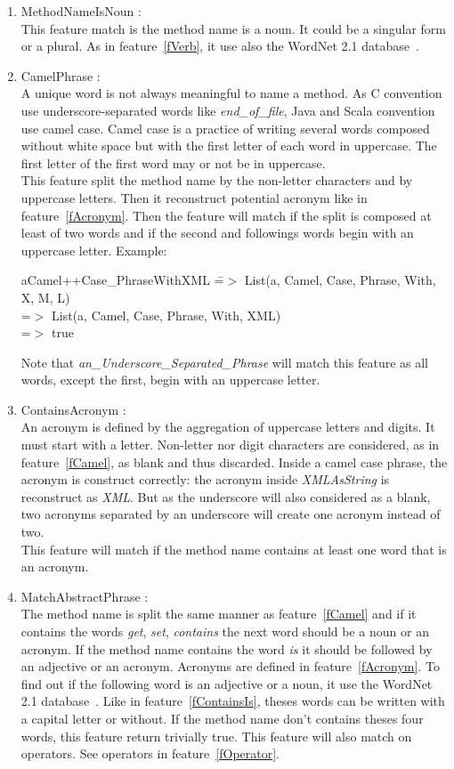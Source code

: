 \documentclass[12pt]{article}
\newcommand{\code}[1]{{\fontfamily{phv}\selectfont \small{\begin{tabbing} #1 \end{tabbing}}}}
\begin{document}
\begin{enumerate}
\item MethodNameIsNoun :\\
	This feature match is the method name is a noun. It could be a singular form or a plural. As in feature~\ref{fVerb}, it use also the WordNet 2.1 database~\cite{wordNet}.
\item CamelPhrase : \label{fCamel}\\
	A unique word is not always meaningful to name a method. As C convention use underscore-separated words like \textit{end\_of\_file}, Java and Scala convention use camel case. Camel case is a practice of writing several words composed without white space but with the first letter of each word in uppercase. The first letter of the first word may or not be in uppercase.\\
This feature split the method name by the non-letter characters and by uppercase letters. Then it reconstruct potential acronym like in feature~\ref{fAcronym}. Then the feature will match if the split is composed at least of two words and if the second and followings words begin with an uppercase letter. Example:
\code{aCamel++Case\_PhraseWithXML \= =$>$ List(a, Camel, Case, Phrase, With, X, M, L)\\
\>=$>$ List(a, Camel, Case, Phrase, With, XML)\\
\>=$>$ true
}
Note that \textit{an\_Underscore\_Separated\_Phrase} will match this feature as all words, except the first, begin with an uppercase letter.
\item ContainsAcronym :\label{fAcronym}\\
	An acronym is defined by the aggregation of uppercase letters and digits. It must start with a letter. Non-letter nor digit characters are considered, as in feature~\ref{fCamel}, as blank and thus discarded. Inside a camel case phrase, the acronym is construct correctly: the acronym inside \textit{XMLAsString} is reconstruct as \textit{XML}. But as the underscore will also considered as a blank, two acronyms separated by an underscore will create one acronym instead of two.\\
This feature will match if the method name contains at least one word that is an acronym.
\item MatchAbstractPhrase :\label{fAbstractPhrase} \\
	The method name is split the same manner as feature~\ref{fCamel} and if it contains the words \textit{get}, \textit{set}, \textit{contains} the next word should be a noun or an acronym. If the method name contains the word \textit{is} it should be followed by an adjective or an acronym. Acronyms are defined in feature~\ref{fAcronym}. To find out if the following word is an adjective or a noun, it use the WordNet 2.1 database~\cite{wordNet}. Like in feature~\ref{fContainsIs}, theses words can be written with a capital letter or without. If the method name don't contains theses four words, this feature return trivially true. This feature will also match on operators. See operators in feature~\ref{fOperator}.

\end{enumerate}
\end{document}
